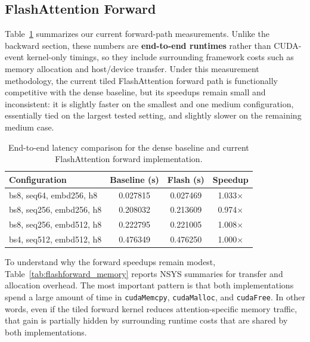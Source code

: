 \documentclass{article}
\begin{document}
\subsection{FlashAttention Forward}

Table~\ref{tab:flashforward_latency} summarizes our current forward-path measurements. Unlike the backward section, these numbers are \textbf{end-to-end runtimes} rather than CUDA-event kernel-only timings, so they include surrounding framework costs such as memory allocation and host/device transfer. Under this measurement methodology, the current tiled FlashAttention forward path is functionally competitive with the dense baseline, but its speedups remain small and inconsistent: it is slightly faster on the smallest and one medium configuration, essentially tied on the largest tested setting, and slightly slower on the remaining medium case.

\begin{table}[t]
\centering
\small
\begin{tabular}{lccc}
\hline
Configuration & Baseline (s) & Flash (s) & Speedup \\
\hline
bs8, seq64, embd256, h8   & 0.027815 & 0.027469 & 1.033$\times$ \\
bs8, seq256, embd256, h8  & 0.208032 & 0.213609 & 0.974$\times$ \\
bs8, seq256, embd512, h8  & 0.222795 & 0.221005 & 1.008$\times$ \\
bs4, seq512, embd512, h8  & 0.476349 & 0.476250 & 1.000$\times$ \\
\hline
\end{tabular}
\caption{End-to-end latency comparison for the dense baseline and current FlashAttention forward implementation.}
\label{tab:flashforward_latency}
\end{table}

To understand why the forward speedups remain modest, Table~\ref{tab:flashforward_memory} reports NSYS summaries for transfer and allocation overhead. The most important pattern is that both implementations spend a large amount of time in \texttt{cudaMemcpy}, \texttt{cudaMalloc}, and \texttt{cudaFree}. In other words, even if the tiled forward kernel reduces attention-specific memory traffic, that gain is partially hidden by surrounding runtime costs that are shared by both implementations.
\end{document}
